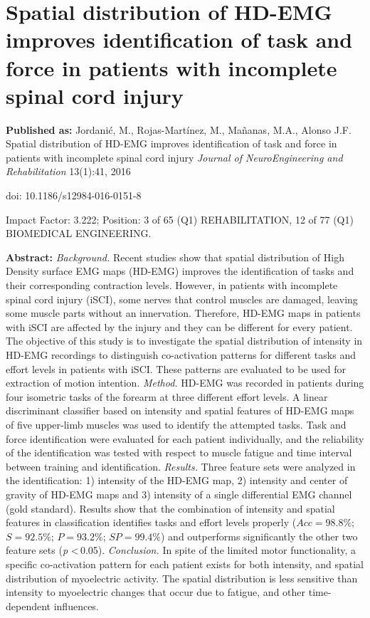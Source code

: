 \chapter[Myoelectric patterns for task identification in patients with iSCI]{Spatial distribution of HD-EMG improves identification of task and force in patients with incomplete spinal cord injury }
\label{ch:p1}
\textbf{Published as:} 
Jordanić, M., Rojas-Martínez, M., Ma\~nanas, M.A., Alonso J.F.
Spatial distribution of HD-EMG improves identification of task and force in patients with incomplete spinal cord injury \textit{Journal of NeuroEngineering and Rehabilitation} 13(1):41, 2016

doi: 10.1186/s12984-016-0151-8

Impact Factor: 3.222; Position: 3 of 65 (Q1) REHABILITATION, 12 of 77 (Q1) BIOMEDICAL ENGINEERING.


\textbf{Abstract:} \textit{Background.} Recent studies show that spatial distribution of High Density surface EMG maps (HD-EMG) improves the identification of tasks and their corresponding contraction levels. However, in patients with incomplete spinal cord injury (iSCI), some nerves that control muscles are damaged, leaving some muscle parts without an innervation.
Therefore, HD-EMG maps in patients with iSCI are affected by the injury and they can be different for every patient.
The objective of this study is to investigate the spatial distribution of intensity in HD-EMG recordings to distinguish
co-activation patterns for different tasks and effort levels in patients with iSCI. These patterns are evaluated to be used
for extraction of motion intention. \textit{Method.} HD-EMG was recorded in patients during four isometric tasks of the forearm at three different effort levels. A linear discriminant classifier based on intensity and spatial features of HD-EMG maps of five upper-limb muscles was used to identify the attempted tasks. Task and force identification were evaluated for each patient individually,
and the reliability of the identification was tested with respect to muscle fatigue and time interval between training and identification. \textit{Results.} Three feature sets were analyzed in the identification: 1) intensity of the HD-EMG map, 2) intensity and center of gravity of HD-EMG maps and 3) intensity of a single differential EMG channel (gold standard). Results show that the combination of intensity and spatial features in classification identifies tasks and effort levels properly ($Acc = 98.8\%$; $S = 92.5\%$; $P = 93.2\%$; $SP = 99.4\%$) and outperforms significantly the other two feature sets (\textit{p} \textless \,0.05). \textit{Conclusion.} In spite of the limited motor functionality, a specific co-activation pattern for each patient exists for both intensity, and spatial distribution of myoelectric activity. The spatial distribution is less sensitive than intensity to myoelectric changes that occur due to fatigue, and other time-dependent influences.

